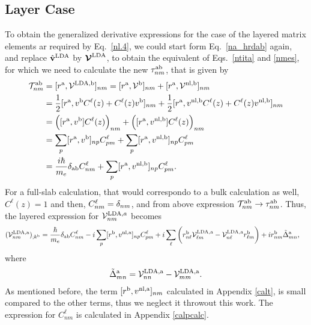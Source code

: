 \subsection{Layer Case}

To obtain the generalized derivative expressions for the case of the
layered matrix elements ar required by Eq.~\eqref{nl.4}, we could
start form Eq.~\eqref{na_hrdab} again, and replace $\hat{\mathbf{v}}^{\mathrm{LDA}}$
by $\boldsymbol{\mathcal{\cal V}}^{\mathrm{LDA}}$, to obtain the equivalent of Eqs.~\eqref{ntita} and
\eqref{nmes}, for which we need to calculate the new
$\tau^{\mathrm{a}\mathrm{b}}_{nm}$, that is given by
\begin{align}\label{na_hrdab-n}
{\cal T}^{\mathrm{a}\mathrm{b}}_{nm}&=
[r^{\mathrm{a}},{\mathbf{\cal V}}^{\mathrm{LDA},\mathrm{b}}]_{nm}
= 
[r^{\mathrm{a}},{\mathbf{\cal V}}^{\mathrm{b}}]_{nm}+
[r^{\mathrm{a}},{\mathbf{\cal V}}^{\mathrm{nl},\mathrm{b}}]_{nm}
\nonumber\\
&=
\frac{1}{2}
[r^{\mathrm{a}},v^{\mathrm{b}} C^\ell(z)+C^\ell(z) v^{\mathrm{b}}]_{nm} 
+
\frac{1}{2}
[r^{\mathrm{a}},v^{\mathrm{nl},\mathrm{b}} C^\ell(z)+C^\ell(z) v^{\mathrm{nl},\mathrm{b}}]_{nm} 
\nonumber\\
&=
\Big([r^{\mathrm{a}},v^{\mathrm{b}}]C^\ell(z)\Big)_{nm} 
+
\Big(
[r^{\mathrm{a}},v^{\mathrm{nl},\mathrm{b}}] C^\ell(z)\Big)_{nm} 
\nonumber\\
&=
\sum_p[r^{\mathrm{a}},v^{\mathrm{b}}]_{np}C^\ell_{pm} 
+
\sum_p 
[r^{\mathrm{a}},v^{\mathrm{nl},\mathrm{b}}]_{np}C^\ell_{pm} 
\nonumber\\
&=
\frac{i\hbar}{m_e}\delta_{\mathrm{a}\mathrm{b}} C^\ell_{nm} 
+
\sum_p 
[r^{\mathrm{a}},v^{\mathrm{nl},\mathrm{b}}]_{np}C^\ell_{pm} 
.
\end{align} 
For a full-slab calculation, that would correspondo to a bulk
calculation as well, $C^\ell(z)=1$ and then, $C^\ell_{nm}=\delta_{nm}$,
and from above expression 
${\cal T}^{\mathrm{a}\mathrm{b}}_{nm}\to \tau^{\mathrm{a}\mathrm{b}}_{nm}$.
Thus, the layered expression for ${\mathbf{\cal V}}^{\mathrm{LDA},a}_{nm}$ becomes
\begin{align}\label{nmesn}
({\mathbf{\cal V}}^{\mathrm{LDA},\mathrm{a}}_{nm})_{;k^{\mathrm{b}}}&=
\frac{\hbar}{m_e}\delta_{\mathrm{a}\mathrm{b}}
C^\ell_{nm} 
-i
\sum_p 
[r^{\mathrm{b}},v^{\mathrm{nl},\mathrm{a}}]_{np}C^\ell_{pm} 
+i
\sum_{\ell}
\bigg(
r^{\mathrm{b}}_{n\ell}  
{\mathbf{\cal V}}^{\mathrm{LDA},\mathrm{a}}_{\ell m}
-
{\mathbf{\cal V}}^{\mathrm{LDA},\mathrm{a}}_{n\ell}   
r^{\mathrm{b}}_{\ell m}
\bigg)  
+i  
r^{\mathrm{b}}_{nm}
\tilde\Delta^{\mathrm{a}}_{mn}
,
\end{align}  
where
\begin{eqnarray}\label{tdel}
\tilde\Delta^{\mathrm{a}}_{mn}
=
{\mathbf{\cal V}}^{\mathrm{LDA},\mathrm{a}}_{nn}  
-
{\mathbf{\cal V}}^{\mathrm{LDA},\mathrm{a}}_{mm}  
.
\end{eqnarray}
As mentioned before, the term $[r^{\mathrm{b}},v^{\mathrm{nl},\mathrm{a}}]_{nm}$
calculated in Appendix \ref{calt}, is small
compared to the other terms, thus we neglect it throwout this work.\cite{valerie} 
The expression for $C^\ell_{nm}$ is calculated in Appendix \ref{calpcalc}.
